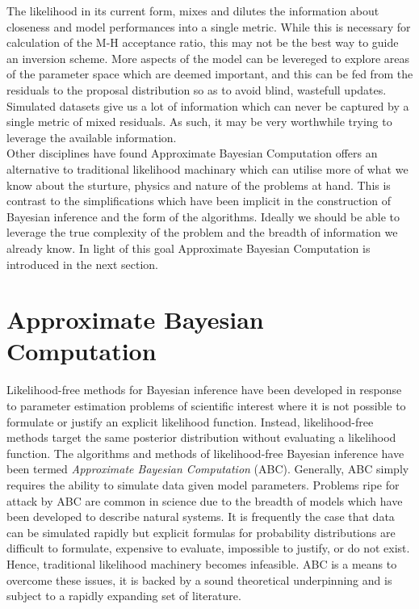 The likelihood in its current form, mixes and dilutes the information about closeness and model performances into a single metric. While this is necessary for calculation of the M-H acceptance ratio, this may not be the best way to guide an inversion scheme. More aspects of the model can be levereged to explore areas of the parameter space which are deemed important, and this can be fed from the residuals to the proposal distribution so as to avoid blind, wastefull updates. Simulated datasets give us a lot of information which can never be captured by a single metric of mixed residuals. As such, it may be very worthwhile trying to leverage the available information.\\

Other disciplines have found Approximate Bayesian Computation offers an alternative to traditional likelihood machinary which can utilise more of what we know about the sturture, physics and nature of the problems at hand. This is contrast to the simplifications which have been implicit in the construction of Bayesian inference and the form of the algorithms. Ideally we should be able to leverage the true complexity of the problem and the breadth of information we already know. In light of this goal Approximate Bayesian Computation is introduced in the next section.  

\section{Approximate Bayesian Computation}

Likelihood-free methods for Bayesian inference have been developed in response to parameter estimation problems of scientific interest where it is not possible to formulate or justify an explicit likelihood function. Instead, likelihood-free methods target the same posterior distribution without evaluating a likelihood function. The algorithms and methods of likelihood-free Bayesian inference have been termed \textit{Approximate Bayesian Computation} (ABC). Generally, ABC simply requires the ability to simulate data given model parameters. Problems ripe for attack by ABC are common in science due to the breadth of models which have been developed to describe natural systems. It is frequently the case that data can be simulated rapidly but explicit formulas for probability distributions are difficult to formulate, expensive to evaluate, impossible to justify, or do not exist. Hence, traditional likelihood machinery becomes infeasible. ABC is a means to overcome these issues, it is backed by a sound theoretical underpinning and is subject to a rapidly expanding set of literature. \\

